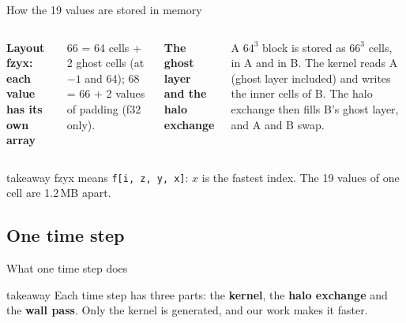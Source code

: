 \documentclass[aspectratio=169,10pt,t]{beamer}
\newcommand{\term}[1]{\textcolor{psblue!85!black}{\textbf{#1}}} %
\newcommand{\code}[1]{\texttt{#1}}
\newcommand{\takeaway}[1]{\par\vfill
  \begin{beamercolorbox}[wd=\textwidth,sep=4pt,rounded=true]{takeaway}
    \small #1
  \end{beamercolorbox}}
\begin{document}
\begin{frame}{How the 19 values are stored in memory}
  \vspace{0mm}
  \begin{columns}[T,onlytextwidth]
    {\small\bfseries Layout \term{fzyx}: each value has its own array\par}
    \vspace{1mm}
    \par
    {\tiny\color{psgray}66 = 64 cells + 2 ghost cells (at $-1$ and 64); 68 = 66 + 2 values of padding (f32 only).\par}
    \vspace{0.5mm}
    
    {\small\bfseries The \term{ghost layer} and the \term{halo exchange}\par}
    \vspace{2mm}
    \centering\resizebox{\linewidth}{!}{}

    \vspace{1mm}
    \raggedright
    {\scriptsize A $64^3$ block is stored as $66^3$ cells, in A and in B. The kernel reads A (ghost layer
    included) and writes the inner cells of B. The halo exchange then fills B's ghost layer, and A and B swap.\par}
  \end{columns}
  \takeaway{fzyx means \code{f[i, z, y, x]}: $x$ is the fastest index. The 19 values of one cell are 1.2\,MB apart.}
\end{frame}
\subsection{One time step}
\begin{frame}{What one time step does}
  \vspace{1.5mm}
  \centering
  \takeaway{Each time step has three parts: the \term{kernel}, the \term{halo exchange} and the \term{wall pass}.
    Only the kernel is generated, and our work makes it faster.}
\end{frame}
\end{document}
